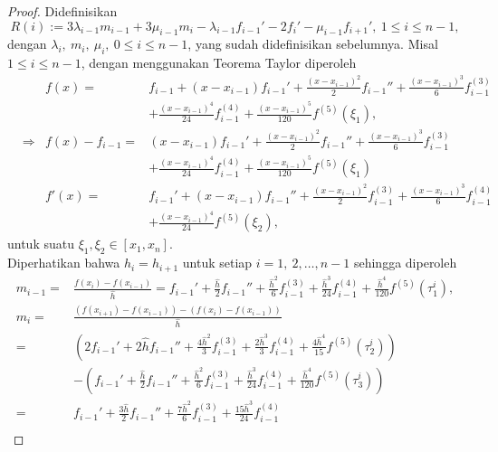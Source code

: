 \begin{proof}
    Didefinisikan
    \begin{equation*}
        R(i) := 3\lambda_{i-1}m_{i-1} + 3\mu_{i-1}m_i - \lambda_{i-1}f_{i-1}' - 2f_i' - \mu_{i-1}f_{i+1}',~1\leq i \leq n-1,
    \end{equation*}
    dengan $\lambda_i,\:m_i,\:\mu_i,\:0 \leq i \leq n-1$, yang sudah didefinisikan sebelumnya.
    Misal $1 \leq i \leq n-1$, dengan menggunakan Teorema Taylor diperoleh
    \begin{align*}
        &&f(x) =& f_{i-1} + (x-x_{i-1})f_{i-1}' + \frac{(x-x_{i-1})^2}{2}f_{i-1}'' + \frac{(x-x_{i-1})^3}{6}f_{i-1}^{(3)} \\
        &&&+ \frac{(x-x_{i-1})^4}{24}f^{(4)}_{i-1} + \frac{(x-x_{i-1})^5}{120}f^{(5)}(\xi_1),\\
        &\Rightarrow&f(x) - f_{i-1} =& (x-x_{i-1})f_{i-1}' + \frac{(x-x_{i-1})^2}{2}f_{i-1}'' + \frac{(x-x_{i-1})^3}{6}f_{i-1}^{(3)} \\
        &&&+ \frac{(x-x_{i-1})^4}{24}f^{(4)}_{i-1} + \frac{(x-x_{i-1})^5}{120}f^{(5)}(\xi_1)\\
        &&f'(x) =& f_{i-1}' + (x-x_{i-1})f_{i-1}'' + \frac{(x-x_{i-1})^2}{2}f_{i-1}^{(3)} + \frac{(x-x_{i-1})^3}{6}f^{(4)}_{i-1}\\
        &&&+ \frac{(x-x_{i-1})^4}{24}f^{(5)}(\xi_2),
    \end{align*}
    untuk suatu $\xi_1,\xi_2 \in [x_1,x_n]$.\\
    Diperhatikan bahwa $h_i = h_{i+1}$ untuk setiap $i=1,~2,\dots,n-1$ sehingga diperoleh
    \begin{align*}
        m_{i-1}=&\frac{f(x_{i})-f(x_{i-1})}{\hat{h}}=f_{i-1}' + \frac{\hat{h}}{2}f_{i-1}'' + \frac{\hat{h}^2}{6}f_{i-1}^{(3)} + \frac{\hat{h}^3}{24}f^{(4)}_{i-1} + \frac{\hat{h}^4}{120}f^{(5)}(\tau_1^i),\\
        m_{i}=&\frac{(f(x_{i+1})-f(x_{i-1}))-(f(x_{i})-f(x_{i-1}))}{\hat{h}}\\
        =&\left( 2f_{i-1}' + 2\hat{h}f_{i-1}'' + \frac{4\hat{h}^2}{3}f_{i-1}^{(3)} + \frac{2\hat{h}^3}{3}f^{(4)}_{i-1} + \frac{4\hat{h}^4}{15}f^{(5)}(\tau_2^i) \right)\\
        &-\left( f_{i-1}' + \frac{\hat{h}}{2}f_{i-1}'' + \frac{\hat{h}^2}{6}f_{i-1}^{(3)} + \frac{\hat{h}^3}{24}f^{(4)}_{i-1} + \frac{\hat{h}^4}{120}f^{(5)}(\tau_3^i) \right)\\
        =&f_{i-1}'+\frac{3\hat{h}}{2}f_{i-1}''+\frac{7\hat{h}^2}{6}f_{i-1}^{(3)}+\frac{15\hat{h}^3}{24}f^{(4)}_{i-1}\\

\end{align*}
\end{proof}
